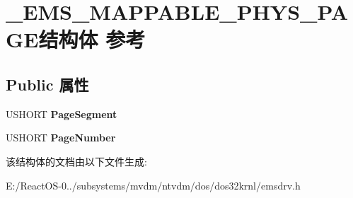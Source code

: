 \hypertarget{struct___e_m_s___m_a_p_p_a_b_l_e___p_h_y_s___p_a_g_e}{}\section{\+\_\+\+E\+M\+S\+\_\+\+M\+A\+P\+P\+A\+B\+L\+E\+\_\+\+P\+H\+Y\+S\+\_\+\+P\+A\+G\+E结构体 参考}
\label{struct___e_m_s___m_a_p_p_a_b_l_e___p_h_y_s___p_a_g_e}
\subsection*{Public 属性}
\begin{DoxyCompactItemize}
\item 
\mbox{\label{struct___e_m_s___m_a_p_p_a_b_l_e___p_h_y_s___p_a_g_e_a8b6780224337553b1d7b874042f5a2be}} 
U\+S\+H\+O\+RT {\bfseries Page\+Segment}
\item 
\mbox{\label{struct___e_m_s___m_a_p_p_a_b_l_e___p_h_y_s___p_a_g_e_af28a62e36af1da8f6c67d301e03aed3c}} 
U\+S\+H\+O\+RT {\bfseries Page\+Number}
\end{DoxyCompactItemize}


该结构体的文档由以下文件生成\+:\begin{DoxyCompactItemize}
\item 
E\+:/\+React\+O\+S-\/0../subsystems/mvdm/ntvdm/dos/dos32krnl/emsdrv.\+h\end{DoxyCompactItemize}
